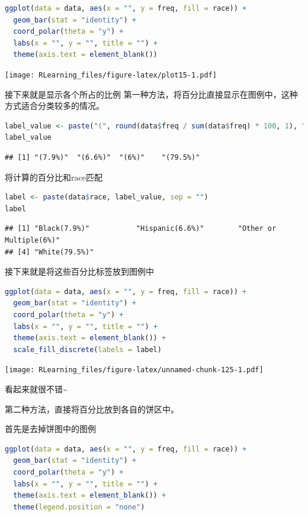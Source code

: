 \documentclass[]{ctexbook}
\begin{document}
\begin{lstlisting}[language=R]
ggplot(data = data, aes(x = "", y = freq, fill = race)) +
  geom_bar(stat = "identity") +
  coord_polar(theta = "y") +
  labs(x = "", y = "", title = "") +
  theme(axis.text = element_blank())
\end{lstlisting}

\texttt{[image: RLearning\_files/figure-latex/plot15-1.pdf]}

接下来就是显示各个所占的比例
第一种方法，将百分比直接显示在图例中，这种方式适合分类较多的情况。

\begin{lstlisting}[language=R]
label_value <- paste("(", round(data$freq / sum(data$freq) * 100, 1), "%)", sep = "")
label_value
\end{lstlisting}

\begin{lstlisting}
## [1] "(7.9%)"  "(6.6%)"  "(6%)"    "(79.5%)"
\end{lstlisting}

将计算的百分比和race匹配

\begin{lstlisting}[language=R]
label <- paste(data$race, label_value, sep = "")
label
\end{lstlisting}

\begin{lstlisting}
## [1] "Black(7.9%)"           "Hispanic(6.6%)"        "Other or Multiple(6%)"
## [4] "White(79.5%)"
\end{lstlisting}

接下来就是将这些百分比标签放到图例中

\begin{lstlisting}[language=R]
ggplot(data = data, aes(x = "", y = freq, fill = race)) +
  geom_bar(stat = "identity") +
  coord_polar(theta = "y") +
  labs(x = "", y = "", title = "") +
  theme(axis.text = element_blank()) +
  scale_fill_discrete(labels = label)
\end{lstlisting}

\texttt{[image: RLearning\_files/figure-latex/unnamed-chunk-125-1.pdf]}

看起来就很不错\textasciitilde{}

第二种方法，直接将百分比放到各自的饼区中。

首先是去掉饼图中的图例

\begin{lstlisting}[language=R]
ggplot(data = data, aes(x = "", y = freq, fill = race)) +
  geom_bar(stat = "identity") +
  coord_polar(theta = "y") +
  labs(x = "", y = "", title = "") +
  theme(axis.text = element_blank()) +
  theme(legend.position = "none")
\end{lstlisting}
\end{document}
